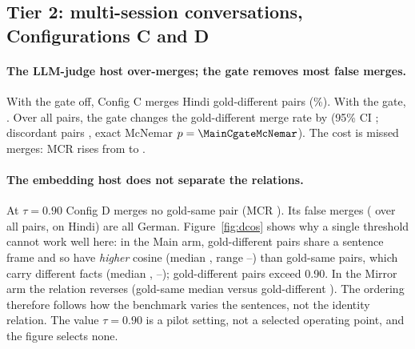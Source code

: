 \subsection{Tier 2: multi-session conversations, Configurations C and D}

\begin{table}[t]\centering\small

\caption{False consolidation rate (FCR, gold-different pairs merged) and missed consolidation rate (MCR, gold-same pairs not merged); lower
is better. ``All'' includes 6 German honorific pairs; ``Hindi'' excludes them. Main = v1.0 arm, Mirror = v1.1m counter-confound arm.}
\label{tab:results}
\end{table}

\paragraph{The LLM-judge host over-merges; the gate removes most false merges.} With the gate off, Config C merges \MainCoffHiFCR{} Hindi
gold-different pairs (\MainCoffHiFCRpct\%). With the gate, \MainClexHiFCR{}. Over all pairs, the gate changes the gold-different merge rate
by \MainCgateDiff{} (95\% CI \MainCgateDiffci{}; discordant pairs \MainCgateDiscordant{}, exact McNemar $p=\MainCgateMcNemar$).
The cost is missed merges: MCR rises from \MainCoffHiMCR{} to \MainClexHiMCR{}. 

\paragraph{The embedding host does not separate the relations.} At $\tau=0.90$ Config D merges no gold-same pair (MCR \MainDoffHiMCR{}).
Its false merges (\MainDoffFCR{} over all pairs, \MainDoffHiFCR{} on Hindi) are all German. Figure~\ref{fig:dcos} shows why a single
threshold cannot work well here: in the Main arm, gold-different pairs share a sentence frame and so have \emph{higher} cosine (median
\MainDiffMedian{}, range \MainDiffMin{}--\MainDiffMax{}) than gold-same pairs, which carry different facts (median \MainSameMedian{},
\MainSameMin{}--\MainSameMax{}); \MainDiffAboveTau{} gold-different pairs exceed 0.90. In the Mirror arm the relation reverses
(gold-same median \MirrorSameMedian{} versus gold-different \MirrorDiffMedian{}). The ordering therefore follows how the benchmark
varies the sentences, not the identity relation. The value $\tau=0.90$ is a pilot setting, not a selected operating point, and the
figure selects none.


